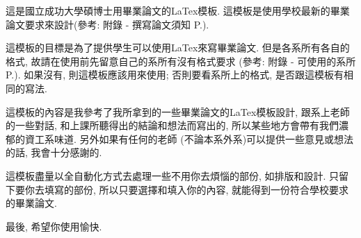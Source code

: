 \StartAbstractChi

這是國立成功大學碩博士用畢業論文的LaTex模板. 這模板是使用學校最新的畢業論文要求來設計(參考: 附錄 - 撰寫論文須知 P.).

這模板的目標是為了提供學生可以使用LaTex來寫畢業論文. 但是各系所有各自的格式, 故請在使用前先留意自己的系所有沒有格式要求 (參考: 附錄 - 可使用的系所 P.). 如果沒有, 則這模板應該用來使用; 否則要看系所上的格式, 是否跟這模板有相同的寫法.

這模板的內容是我參考了我所拿到的一些畢業論文的LaTex模板設計, 跟系上老師的一些對話, 和上課所聽得出的結論和想法而寫出的, 所以某些地方會帶有我們濃郁的資工系味道. 另外如果有任何的老師 (不論本系外系)可以提供一些意見或想法的話, 我會十分感謝的.

這模板盡量以全自動化方式去處理一些不用你去煩惱的部份, 如排版和設計. 只留下要你去填寫的部份, 所以只要選擇和填入你的內容, 就能得到一份符合學校要求的畢業論文.

最後, 希望你使用愉快.

\EndAbstractChi
